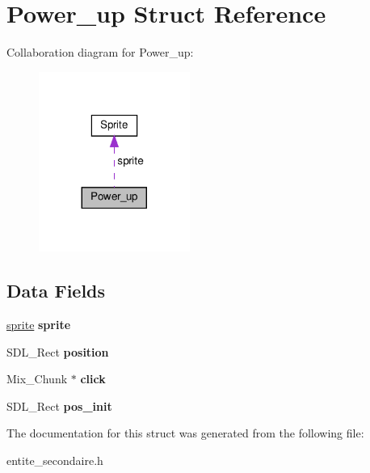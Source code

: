 \hypertarget{structPower__up}{}\section{Power\+\_\+up Struct Reference}
\label{structPower__up}


Collaboration diagram for Power\+\_\+up\+:
\nopagebreak
\begin{figure}[H]
\begin{center}
\leavevmode
\includegraphics[width=140pt]{structPower__up__coll__graph}
\end{center}
\end{figure}
\subsection*{Data Fields}
\begin{DoxyCompactItemize}
\item 
\mbox{\label{structPower__up_a76e1d05c017a2491cda4ac0d3014f0eb}} 
\hyperlink{structSprite}{sprite} {\bfseries sprite}
\item 
\mbox{\label{structPower__up_a7369bc0bc57931b751b8889641819c4d}} 
S\+D\+L\+\_\+\+Rect {\bfseries position}
\item 
\mbox{\label{structPower__up_ab062d39a523db0b01fd450575852b62b}} 
Mix\+\_\+\+Chunk $\ast$ {\bfseries click}
\item 
\mbox{\label{structPower__up_a928fc674bab68a3f650283e606ef16f2}} 
S\+D\+L\+\_\+\+Rect {\bfseries pos\+\_\+init}
\end{DoxyCompactItemize}


The documentation for this struct was generated from the following file\+:\begin{DoxyCompactItemize}
\item 
entite\+\_\+secondaire.\+h\end{DoxyCompactItemize}
